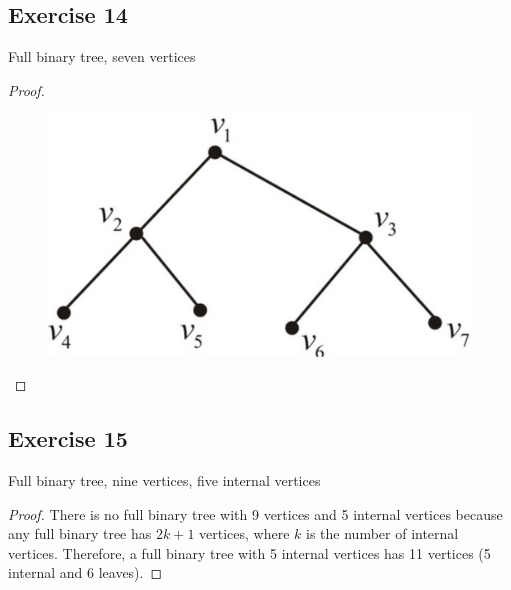 \documentclass[14pt]{extarticle}
\begin{document}
\subsection{Exercise 14}
Full binary tree, seven vertices
\begin{proof}
    \begin{figure}[ht!]
        \centering
        \includegraphics[scale=0.1]{../images/10.5.14.png}
    \end{figure}
\end{proof}

\subsection{Exercise 15}
Full binary tree, nine vertices, five internal vertices
\begin{proof}
    There is no full binary tree with 9 vertices and 5 internal vertices because any full binary tree has \(2k+1\) vertices,
    where \(k\) is the number of internal vertices. Therefore, a full binary tree with 5 internal vertices has 11 vertices
    (5 internal and 6 leaves).
\end{proof}
\end{document}
